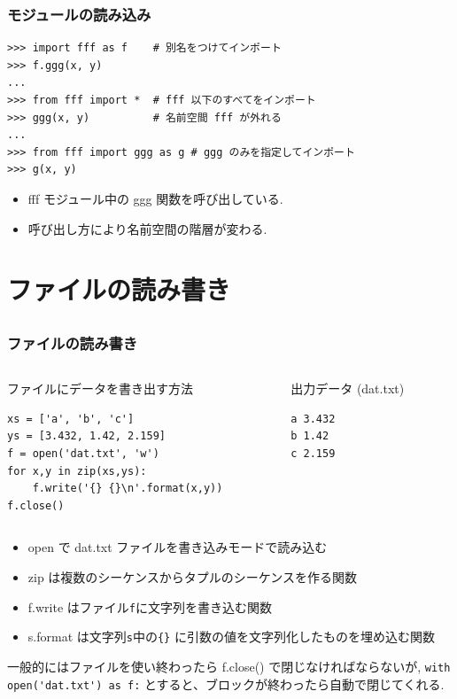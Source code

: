 \begin{frame}[t,fragile]
\frametitle{モジュールの読み込み}
\begin{lstlisting}
>>> import fff as f    # 別名をつけてインポート
>>> f.ggg(x, y)
...
>>> from fff import *  # fff 以下のすべてをインポート
>>> ggg(x, y)          # 名前空間 fff が外れる
...
>>> from fff import ggg as g # ggg のみを指定してインポート
>>> g(x, y)
\end{lstlisting}
\begin{itemize}
\item fff モジュール中の ggg 関数を呼び出している. 
\item 呼び出し方により名前空間の階層が変わる. 
\end{itemize}

\end{frame}

\section{ファイルの読み書き}
\subsection*{\redm\whitem\greenb}

\begin{frame}[t,fragile]
\frametitle{ファイルの読み書き}
\begin{columns}
\begin{column}{8cm}
ファイルにデータを書き出す方法
\begin{lstlisting}
xs = ['a', 'b', 'c']
ys = [3.432, 1.42, 2.159]
f = open('dat.txt', 'w')
for x,y in zip(xs,ys):
    f.write('{} {}\n'.format(x,y))
f.close()
\end{lstlisting}
\end{column}
\begin{column}{4cm}
出力データ (dat.txt)
\begin{lstlisting}
a 3.432
b 1.42
c 2.159
\end{lstlisting}
\end{column}
\end{columns}

\begin{itemize}
\item open で dat.txt ファイルを書き込みモードで読み込む
\item zip は複数のシーケンスからタプルのシーケンスを作る関数
\item f.write はファイル\verb|f|に文字列を書き込む関数
\item s.format は文字列\verb|s|中の\verb|{}| に引数の値を文字列化したものを埋め込む関数
\end{itemize}
 一般的にはファイルを使い終わったら f.close() で閉じなければならないが,
 \verb|with open('dat.txt') as f:| とすると、ブロックが終わったら自動で閉じてくれる.
\end{frame}

